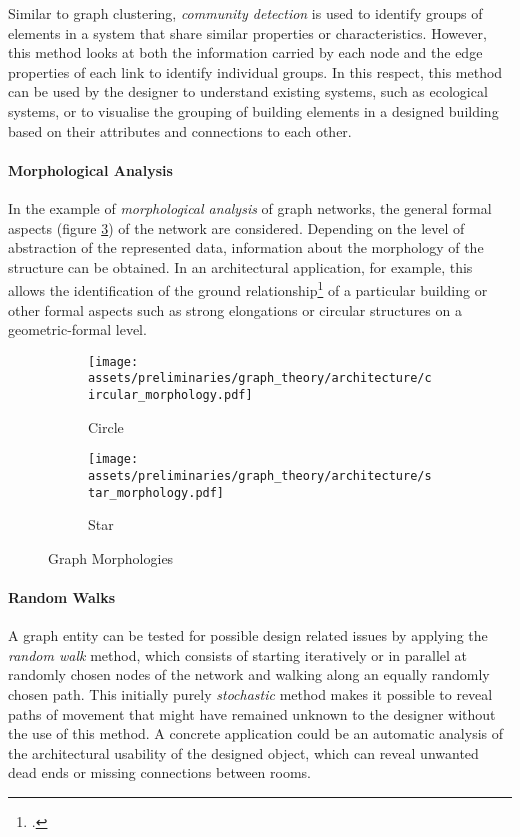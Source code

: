 \documentclass[a4paper, 12pt]{report}
\begin{document}
Similar to graph clustering, \textit{community detection} is used to identify groups of elements in a system that share similar properties or characteristics. However, this method looks at both the information carried by each node and the edge properties of each link to identify individual groups. In this respect, this method can be used by the designer to understand existing systems, such as ecological systems, or to visualise the grouping of building elements in a designed building based on their attributes and connections to each other.

\paragraph{Morphological Analysis}\label{par:morphological-analysis}

In the example of \textit{morphological analysis} of graph networks, the general formal aspects (figure \ref{fig:graph-morphologies}) of the network are considered. Depending on the level of abstraction of the represented data, information about the morphology of the structure can be obtained. In an architectural application, for example, this allows the identification of the ground relationship\footcite{alymani2023classifying} of a particular building or other formal aspects such as strong elongations or circular structures on a geometric-formal level.

\begin{figure}
\centering
\begin{subfigure}{.5\textwidth}
\centering
\texttt{[image: assets/preliminaries/graph\_theory/architecture/circular\_morphology.pdf]}
\caption{Circle}
\label{fig:circle}
\end{subfigure}%
\begin{subfigure}{.5\textwidth}
\centering
\texttt{[image: assets/preliminaries/graph\_theory/architecture/star\_morphology.pdf]}
\caption{Star}
\label{fig:star}
\end{subfigure}
\caption{Graph Morphologies}
\label{fig:graph-morphologies}
\end{figure}

\paragraph{Random Walks}\label{par:random-walks}

A graph entity can be tested for possible design related issues by applying the \textit{random walk} method, which consists of starting iteratively or in parallel at randomly chosen nodes of the network and walking along an equally randomly chosen path. This initially purely \textit{\gls{stochastic}} method makes it possible to reveal paths of movement that might have remained unknown to the designer without the use of this method. A concrete application could be an automatic analysis of the architectural usability of the designed object, which can reveal unwanted dead ends or missing connections between rooms.
\end{document}
